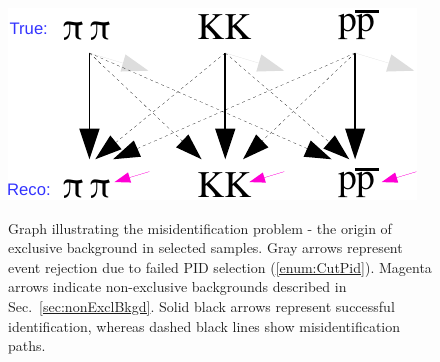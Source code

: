 \begin{figure}[ht!]
\centering%
\parbox{0.4725\textwidth}{%
  \centering%
  \includegraphics[width=\linewidth]{graphics/backgrounds/pid-crop2.pdf}\label{fig:misidentificationGraph}
}%
\quad%
\parbox{0.4725\textwidth}{%
    \caption[Graph illustrating the misidentification problem.]{Graph illustrating the misidentification problem - the origin of exclusive background in selected samples. Gray arrows represent event rejection due to failed PID selection (\ref{enum:CutPid}). Magenta arrows indicate non-exclusive backgrounds described in Sec.~\ref{sec:nonExclBkgd}. Solid black arrows represent successful identification, whereas dashed black lines show misidentification paths.}
}%

\end{figure}


